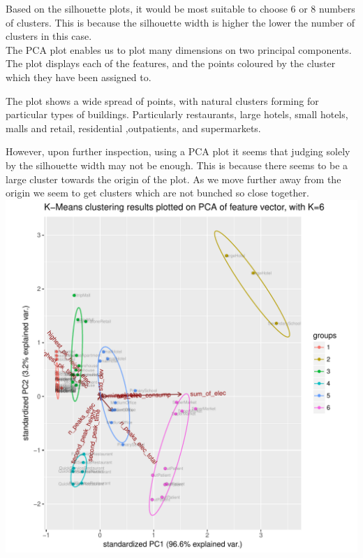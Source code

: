 \documentclass[12pt]{article}\usepackage[]{graphicx}\usepackage[]{color}
\makeatletter
\def\maxwidth{ %
  \ifdim\Gin@nat@width>\linewidth
    \linewidth
  \else
    \Gin@nat@width
  \fi
}
\newenvironment{knitrout}{}{} %
\makeatother
\begin{document}
Based on the silhouette plots, it would be most suitable to choose 6 or 8 numbers of clusters. This is because the silhouette width is higher the lower the number of clusters in this case. \\


The PCA plot enables us to plot many dimensions on two principal components. \\

The plot displays each of the features, and the points coloured by the cluster which they have been assigned to. 

The plot shows a wide spread of points, with natural clusters forming for particular types of buildings. Particularly restaurants, large hotels, small hotels, malls and retail, residential ,outpatients, and supermarkets.


However, upon further inspection, using a PCA plot it seems that judging solely by the silhouette width may not be enough. This is because there seems to be a large cluster towards the origin of the plot. As we move further away from the origin we seem to get clusters which are not bunched so close together. \\



\begin{knitrout}
\color{fgcolor}
\includegraphics[width=\maxwidth]{figure/pca_plot-1} 

\end{knitrout}
\end{document}

